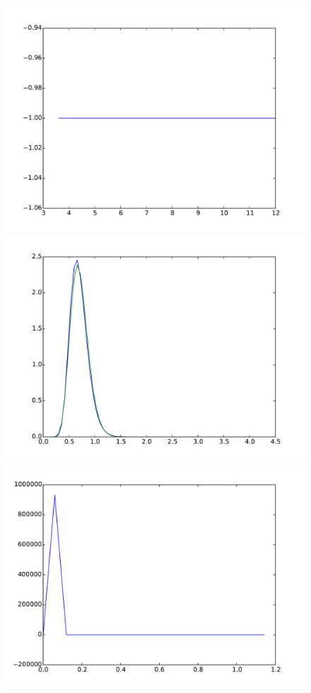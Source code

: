 \documentclass{article}
\begin{document}
\begin{figure}[htb]
\begin{minipage}{.3\textwidth}
		\includegraphics[width=0.97\linewidth]{bootstrap-filter/relative_tail_simple_1_3.pdf}
	\end{minipage}
	\begin{minipage}{.3\textwidth}
		\centering
		\includegraphics[width=0.97\linewidth]{bootstrap-filter/global_simple_3_1.pdf}
	\end{minipage}
	\begin{minipage}{.3\textwidth}
		\centering
		\includegraphics[width=0.97\linewidth]{bootstrap-filter/relative_beginning_simple_3_1.pdf}

\end{minipage}
\end{figure}
\end{document}
